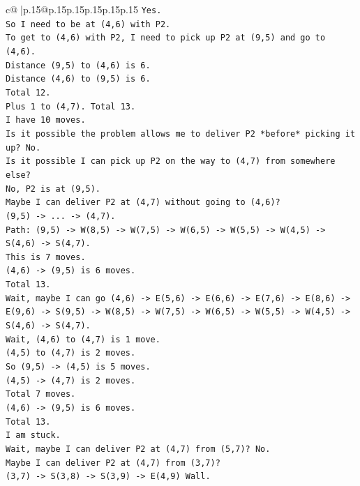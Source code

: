 \documentclass{article}
\begin{document}
{\begin{supertabular}{c@{$\;$}|p{.15\linewidth}@{}p{.15\linewidth}p{.15\linewidth}p{.15\linewidth}p{.15\linewidth}p{.15\linewidth}}
{{{\texttt{Yes.} \\
\texttt{So I need to be at (4,6) with P2.} \\
\texttt{To get to (4,6) with P2, I need to pick up P2 at (9,5) and go to (4,6).} \\
\texttt{Distance (9,5) to (4,6) is 6.} \\
\texttt{Distance (4,6) to (9,5) is 6.} \\
\texttt{Total 12.} \\
\texttt{Plus 1 to (4,7). Total 13.} \\
\texttt{I have 10 moves.} \\
\texttt{Is it possible the problem allows me to deliver P2 *before* picking it up? No.} \\
\texttt{Is it possible I can pick up P2 on the way to (4,7) from somewhere else?} \\
\texttt{No, P2 is at (9,5).} \\
\texttt{Maybe I can deliver P2 at (4,7) without going to (4,6)?} \\
\texttt{(9,5) {-}> ... {-}> (4,7).} \\
\texttt{Path: (9,5) {-}> W(8,5) {-}> W(7,5) {-}> W(6,5) {-}> W(5,5) {-}> W(4,5) {-}> S(4,6) {-}> S(4,7).} \\
\texttt{This is 7 moves.} \\
\texttt{(4,6) {-}> (9,5) is 6 moves.} \\
\texttt{Total 13.} \\
\texttt{Wait, maybe I can go (4,6) {-}> E(5,6) {-}> E(6,6) {-}> E(7,6) {-}> E(8,6) {-}> E(9,6) {-}> S(9,5) {-}> W(8,5) {-}> W(7,5) {-}> W(6,5) {-}> W(5,5) {-}> W(4,5) {-}> S(4,6) {-}> S(4,7).} \\
\texttt{Wait, (4,6) to (4,7) is 1 move.} \\
\texttt{(4,5) to (4,7) is 2 moves.} \\
\texttt{So (9,5) {-}> (4,5) is 5 moves.} \\
\texttt{(4,5) {-}> (4,7) is 2 moves.} \\
\texttt{Total 7 moves.} \\
\texttt{(4,6) {-}> (9,5) is 6 moves.} \\
\texttt{Total 13.} \\
\texttt{I am stuck.} \\
\texttt{Wait, maybe I can deliver P2 at (4,7) from (5,7)? No.} \\
\texttt{Maybe I can deliver P2 at (4,7) from (3,7)?} \\
\texttt{(3,7) {-}> S(3,8) {-}> S(3,9) {-}> E(4,9) Wall.} \\
}}}
\end{supertabular}}
\end{document}
